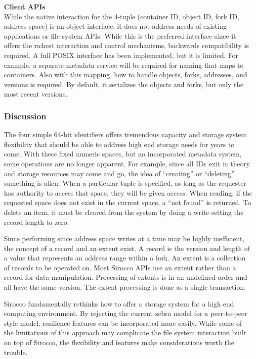 \noindent\textbf{Client APIs}\\
While the native interaction for the 4-tuple (container ID, object ID, fork ID,
address space) is an object interface, it does not address needs of existing
applications or file system APIs. While this is the preferred interface since
it offers the richest interaction and control mechanisms, backwards
compatibility is required. A full POSIX interface has been implemented, but it
is limited. For example, a separate metadata service will be required for
naming that maps to containers. Also with this mapping, how to handle objects,
forks, addresses, and versions is required. By default, it serializes the
objects and forks, but only the most recent versions.

\subsubsection{Discussion}
The four simple 64-bit identifiers offers tremendous capacity and storage
system flexibility that should be able to address high end storage needs for
years to come. With these fixed numeric spaces, but no incorporated metadata
system, some operations are no longer apparent. For example, since all IDs exit
in theory and storage resources may come and go, the idea of ``creating'' or
``deleting'' something is alien. When a particular tuple is specified, as long
as the requester has authority to access that space, they will be given access.
When reading, if the requested space does not exist in the current space, a
``not found'' is returned. To delete an item, it must be cleared from the
system by doing a write setting the record length to zero.

Since performing since address space writes at a time may be highly
inefficient, the concept of a record and an extent exist. A record is the
version and length of a value that represents an address range within a fork.
An extent is a collection of records to be operated on. Most Sirocco APIs use
an extent rather than a record for data manipulation. Processing of extents is
in an undefined order and all have the same version. The extent processing is
done as a single transaction.

Sirocco fundamentally rethinks how to offer a storage system for a high end
computing environment. By rejecting the current zebra model for a peer-to-peer
style model, resilience features can be incorporated more easily. While some of
the limitations of this approach may complicate the file system interaction
built on top of Sirocco, the flexibility and features make considerations worth
the trouble.

